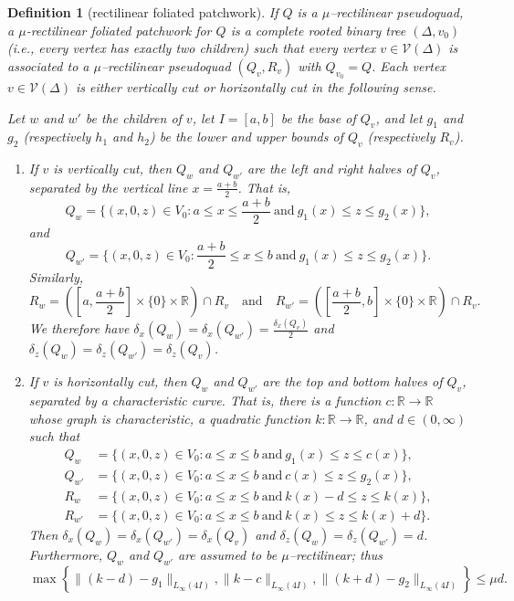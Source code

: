 \documentclass[11pt,reqno]{amsart}
\newcommand{\R}{\mathbb{R}}
\newcommand{\cV}{\mathcal{V}}
\newcommand{\0}{\mathbf{0}}
\renewcommand{\1}{\mathbf 1}
\newcommand{\from}{\colon}
\renewcommand{\mid}{:}
\renewcommand{\le}{\leqslant}
\newtheorem{defn}[thm]{Definition}
\theoremstyle{remark}
\begin{document}
\begin{defn}[rectilinear foliated patchwork]\label{def:rectilinear foliated patchwork}
  If $Q$ is a $\mu$--rectilinear pseudoquad, a \emph{\(\mu\)-rectilinear foliated patchwork} for $Q$ is a complete rooted binary tree \((\Delta,v_0)\) (i.e., every vertex has exactly two children) such that every vertex \(v\in \cV(\Delta)\) is associated to a $\mu$--rectilinear pseudoquad \((Q_v,R_v)\) with $Q_{v_0}=Q$.  Each vertex $v\in \cV(\Delta)$ is either \emph{vertically cut} or \emph{horizontally cut} in the following sense.

  Let $w$ and $w'$ be the children of $v$, let $I=[a,b]$ be the base of $Q_v$, and let $g_1$ and $g_2$ (respectively $h_1$ and $h_2$) be the lower and upper bounds of $Q_v$ (respectively $R_v$).
  \begin{enumerate}
  \item
    If $v$ is vertically cut, then $Q_w$ and $Q_{w'}$ are the left and right halves of $Q_v$, separated by the vertical line $x=\frac{a+b}{2}$.  That is,
    $$Q_{w}=\biggl\{(x,0,z)\in V_0\mid a\le x\le \frac{a+b}{2}\ \mathrm{and}\  g_1(x)\le z\le g_2(x)\biggr\},$$
    and
    $$Q_{w'}=\biggl\{(x,0,z)\in V_0\mid \frac{a+b}{2}\le x\le b \ \mathrm{and}\  g_1(x)\le z\le g_2(x)\biggr\}.$$
    Similarly,
    $$
    R_{w}=\left(\left[a, \frac{a+b}{2}\right] \times\{0\}\times  \R\right) \cap R_v\quad\mathrm{and}\quad  R_{w'}=\left(\left[\frac{a+b}{2}, b\right] \times\{0\}\times  \R\right) \cap R_v.
      $$ We therefore have $\delta_x(Q_w)=\delta_x(Q_{w'})=\frac{\delta_x(Q_v)}{2}$ and $\delta_z(Q_w)=\delta_z(Q_{w'})=\delta_z(Q_v)$.
  \item
    If $v$ is horizontally cut, then $Q_w$ and $Q_{w'}$ are the top and bottom halves of $Q_v$, separated by a characteristic curve.  That is, there is a function $c\from \R\to \R$ whose graph is characteristic, a quadratic function $k\from \R\to \R$, and $d\in (0,\infty)$ such that
    \begin{align*}
    Q_{w}&=\big\{(x,0,z)\in V_0\mid a\le x\le b\ \mathrm{and}\  g_1(x)\le z\le c(x)\big\},\\
    Q_{w'}&=\big\{(x,0,z)\in V_0\mid a\le x\le b\ \mathrm{and}\  c(x)\le z\le g_2(x)\big\},\\
    R_{w}&=\big\{(x,0,z)\in V_0\mid a\le x\le b\ \mathrm{and}\  k(x)-d\le z\le k(x)\big\},\\
    R_{w'}&=\big\{(x,0,z)\in V_0\mid a\le x\le b\ \mathrm{and}\  k(x)\le z\le k(x)+d\big\}.
    \end{align*}
    Then $\delta_x(Q_w)=\delta_x(Q_{w'})=\delta_x(Q_v)$ and $\delta_z(Q_w)=\delta_z(Q_{w'})=d$.  Furthermore, $Q_w$ and $Q_{w'}$ are assumed to be $\mu$--rectilinear; thus
    \begin{equation}\label{eq:horiz cut edge bounds}
      \max\left\{\|(k-d)-g_1\|_{L_\infty(4 I)}, \|k-c\|_{L_\infty(4 I)},\|(k+d)-g_2\|_{L_\infty(4 I)}\right\}\le \mu d.
    \end{equation}
  \end{enumerate}


\end{defn}
\end{document}
